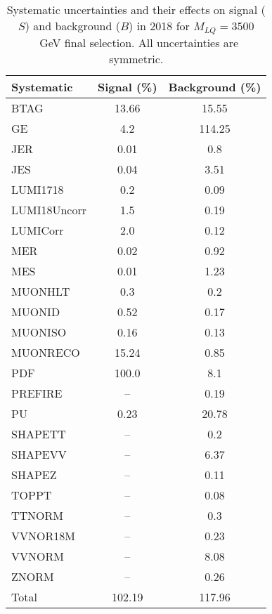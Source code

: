 \begin{table}[htbp]
\begin{center}
\caption{Systematic uncertainties and their effects on signal ($S$) and background ($B$) in 2018 for $M_{LQ}=3500$~GeV final selection. All uncertainties are symmetric.}
\begin{tabular}{lcc}
\hline\hline
Systematic & Signal (\%) & Background (\%) \\ \hline 
BTAG & 13.66 & 15.55\\ 
GE & 4.2 & 114.25\\ 
JER & 0.01 & 0.8\\ 
JES & 0.04 & 3.51\\ 
LUMI1718 & 0.2 & 0.09\\ 
LUMI18Uncorr & 1.5 & 0.19\\ 
LUMICorr & 2.0 & 0.12\\ 
MER & 0.02 & 0.92\\ 
MES & 0.01 & 1.23\\ 
MUONHLT & 0.3 & 0.2\\ 
MUONID & 0.52 & 0.17\\ 
MUONISO & 0.16 & 0.13\\ 
MUONRECO & 15.24 & 0.85\\ 
PDF & 100.0 & 8.1\\ 
PREFIRE & -- & 0.19\\ 
PU & 0.23 & 20.78\\ 
SHAPETT & -- & 0.2\\ 
SHAPEVV & -- & 6.37\\ 
SHAPEZ & -- & 0.11\\ 
TOPPT & -- & 0.08\\ 
TTNORM & -- & 0.3\\ 
VVNOR18M & -- & 0.23\\ 
VVNORM & -- & 8.08\\ 
ZNORM & -- & 0.26\\ 
Total & 102.19 & 117.96\\ \hline \hline
\end{tabular}
\label{tab:SysUncertainties_uujj_3500}
\end{center}
\end{table}

